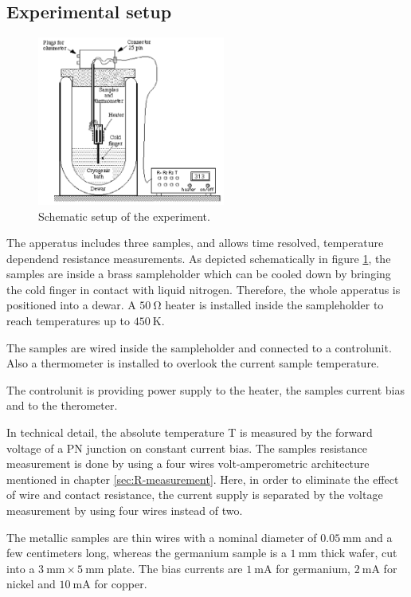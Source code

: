 \subsection{Experimental setup}
\label{sec:setup}

\begin{figure}
  \centering
  \includegraphics[width=0.55\textwidth]{graphics/setup.png}
  \caption[width=0.4\textwidth]{Schematic setup of the experiment\cite{instruction}.}
  \label{fig:setup}
\end{figure}

The apperatus includes three samples, and allows time resolved, temperature dependend resistance measurements.
As depicted schematically in figure \ref{fig:setup}, the samples are inside a brass sampleholder which can be cooled down by bringing the cold finger in contact with liquid nitrogen.
Therefore, the whole apperatus is positioned into a dewar.
A $\SI{50}{\ohm}$ heater is installed inside the sampleholder to reach temperatures up to $\SI{450}{\kelvin}$.

The samples are wired inside the sampleholder and connected to a controlunit.
Also a thermometer is installed to overlook the current sample temperature.

The controlunit is providing power supply to the heater, the samples current bias and to the therometer.

In technical detail, the absolute temperature T is measured by the forward voltage of a PN junction on constant current bias. 
The samples resistance measurement is done by using a four wires volt-amperometric architecture mentioned in chapter \ref{sec:R-measurement}. 
Here, in order to eliminate the effect of wire and contact resistance, the current supply is separated by the voltage measurement by using four wires instead of two.

The metallic samples are thin wires with a nominal diameter of $\SI{0.05}{\milli\meter}$ and a few centimeters long, whereas the germanium sample is a $\SI{1}{\milli\meter}$ thick wafer, cut into a $\SI{3}{\milli\meter} \times \SI{5}{\milli\meter}$ plate.
The bias currents are $\SI{1}{\milli\ampere}$ for germanium, $\SI{2}{\milli\ampere}$ for nickel and $\SI{10}{\milli\ampere}$ for copper.

